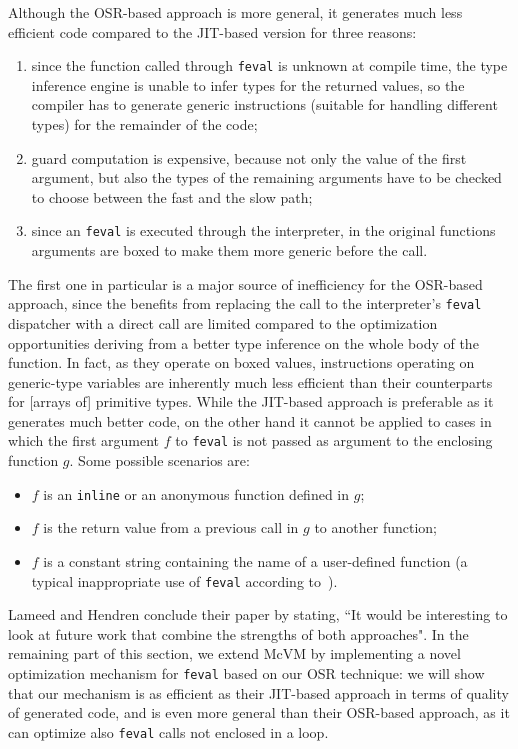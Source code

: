 Although the OSR-based approach is more general, it generates much less efficient code compared to the JIT-based version for three reasons:
\begin{enumerate}
\item since the function called through {\tt feval} is unknown at compile time, the type inference engine is unable to infer types for the returned values, so the compiler has to generate generic instructions (suitable for handling different types) for the remainder of the code;
\item guard computation is expensive, because not only the value of the first argument, but also the types of the remaining arguments have to be checked to choose between the fast and the slow path;
\item since an {\tt feval} is executed through the interpreter, in the original functions arguments are boxed to make them more generic before the call.
\end{enumerate}

The first one in particular is a major source of inefficiency for the OSR-based approach, since the benefits from replacing the call to the interpreter's {\tt feval} dispatcher with a direct call are limited compared to the optimization opportunities deriving from a better type inference on the whole body of the function. In fact, as they operate on boxed values, instructions operating on generic-type variables are inherently much less efficient than their counterparts for [arrays of] primitive types. While the JIT-based approach is preferable as it generates much better code, on the other hand it cannot be applied to cases in which the first argument $f$ to {\tt feval} is not passed as argument to the enclosing function $g$. Some possible scenarios are:
\begin{itemize}
\item $f$ is an {\tt inline} or an anonymous function defined in $g$;
\item $f$ is the return value from a previous call in $g$ to another function;
\item $f$ is a constant string containing the name of a user-defined function (a typical inappropriate use of {\tt feval} according to~\cite{radpour2013refactoring}).
\end{itemize}
 
Lameed and Hendren conclude their paper by stating, ``It would be interesting to look at future work that combine the
strengths of both approaches". In the remaining part of this section, we extend McVM by implementing a novel optimization mechanism for {\tt feval} based on our OSR technique: we will show that our mechanism is as efficient as their JIT-based approach in terms of quality of generated code, and is even more general than their OSR-based approach, as it can optimize also {\tt feval} calls not enclosed in a loop.

